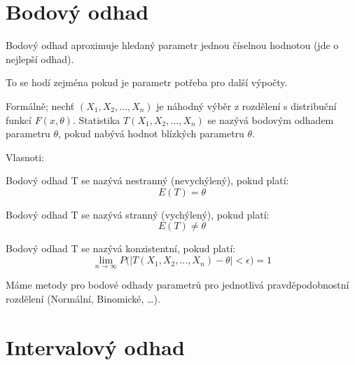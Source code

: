
\section{Bodový odhad}

\begin{compactitem}
    \item Bodový odhad aproximuje hledaný parametr jednou číselnou hodnotou (jde o nejlepší odhad). \begin{compactitem}
        \item To se hodí zejména pokud je parametr potřeba pro další výpočty.
    \end{compactitem}

    \item Formálně; nechť $(X_1, X_2, \ldots, X_n)$ je náhodný výběr z rozdělení s distribuční funkcí $F( x, \theta)$. Statistika $T(X_1, X_2, \ldots, X_n)$ se nazývá bodovým odhadem parametru $\theta$, pokud nabývá hodnot blízkých parametru $\theta$.

    \item Vlasnoti: \begin{compactitem}
        \item Bodový odhad T se nazývá nestranný (nevychýlený), pokud platí:
        $$ E(T) = \theta $$
        \item Bodový odhad T se nazývá stranný (vychýlený), pokud platí:
        $$ E(T) \not= \theta $$
        \item Bodový odhad T se nazývá konzistentní, pokud platí:
        $$ \lim_{n \rightarrow \infty}{P(|T(X_1, X_2, \ldots, X_n) - \theta|} < \epsilon) = 1 $$
    \end{compactitem}

    \item Máme metody pro bodové odhady parametrů pro jednotlivá pravděpodobnostní rozdělení (Normální, Binomické, \dots).
\end{compactitem}


\section{Intervalový odhad}

